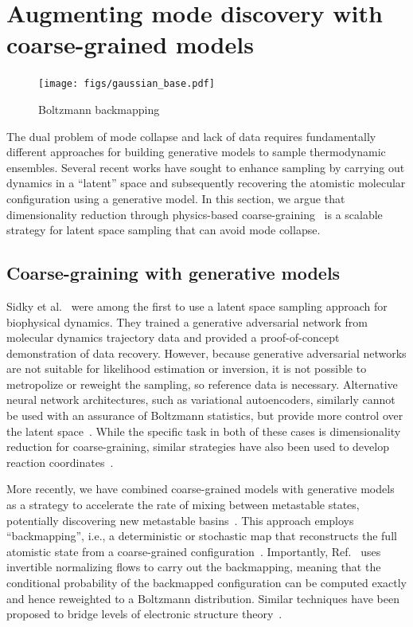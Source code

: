 \documentclass[11pt]{article}
\begin{document}
\section{Augmenting mode discovery with coarse-grained models}\label{sec:nfphys}

\begin{figure}
    \centering
    \texttt{[image: figs/gaussian\_base.pdf]}
    \caption{Boltzmann backmapping}
    \label{fig:enter-label}
\end{figure}

The dual problem of mode collapse and lack of data requires fundamentally different approaches for building generative models to sample thermodynamic ensembles.
Several recent works have sought to enhance sampling by carrying out dynamics in a ``latent'' space and subsequently recovering the atomistic molecular configuration using a generative model.
In this section, we argue that dimensionality reduction through physics-based coarse-graining~\cite{noid_multiscale_2008, jin_bottom-up_2022} is a scalable strategy for latent space sampling that can avoid mode collapse.

\subsection{Coarse-graining with generative models}

Sidky et al.~\cite{sidky_molecular_2020} were among the first to use a latent space sampling approach for biophysical dynamics.
They trained a generative adversarial network from molecular dynamics trajectory data and provided a proof-of-concept demonstration of data recovery.
However, because generative adversarial networks are not suitable for likelihood estimation or inversion, it is not possible to metropolize or reweight the sampling, so reference data is necessary.
Alternative neural network architectures, such as variational autoencoders, similarly cannot be used with an assurance of Boltzmann statistics, but provide more control over the latent space~\cite{wang_coarse-graining_2019}.
While the specific task in both of these cases is dimensionality reduction for coarse-graining, similar strategies have also been used to develop reaction coordinates~\cite{ribeiro_reweighted_2018}.

More recently, we have combined coarse-grained models with generative models as a strategy to accelerate the rate of mixing between metastable states, potentially discovering new metastable basins~\cite{chennakesavalu_ensuring_2023}.
This approach employs ``backmapping'', i.e., a deterministic or stochastic map that reconstructs the full atomistic state from a coarse-grained configuration~\cite{dunbrack_jr_bayesian_1997, bower_prediction_1997}.
Importantly, Ref.~\cite{chennakesavalu_adaptive_2023} uses invertible normalizing flows to carry out the backmapping, meaning that the conditional probability of the backmapped configuration can be computed exactly and hence reweighted to a Boltzmann distribution. 
Similar techniques have been proposed to bridge levels of electronic structure theory~\cite{maier_bypassing_2022}.
\end{document}
